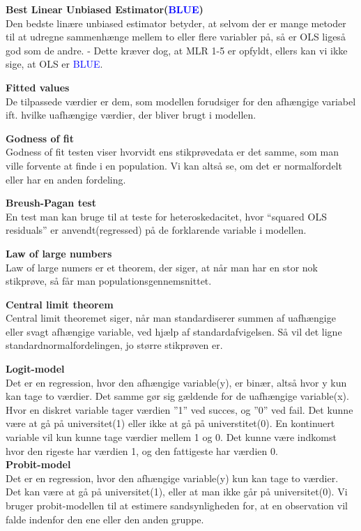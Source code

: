 \documentclass[
  10pt,
]{article}
\begin{document}
\textbf{Best Linear Unbiased Estimator(\textcolor{blue}{BLUE})}
\label{sec:BLUE}\\
Den bedste linære unbiased estimator betyder, at selvom der er mange
metoder til at udregne sammenhænge mellem to eller flere variabler på,
så er OLS ligeså god som de andre. - Dette kræver dog, at MLR 1-5 er
opfyldt, ellers kan vi ikke sige, at OLS er \textcolor{blue}{BLUE}.
\newline

\textbf{Fitted values}\\
De tilpassede værdier er dem, som modellen forudsiger for den afhængige
variabel ift. hvilke uafhængige værdier, der bliver brugt i modellen.
\newline

\textbf{Godness of fit} \label{sec:godness}\\
Godness of fit testen viser hvorvidt ens stikprøvedata er det samme, som
man ville forvente at finde i en population. Vi kan altså se, om det er
normalfordelt eller har en anden fordeling. \newline

\textbf{Breush-Pagan test} \label{sec:BP-test}\\
En test man kan bruge til at teste for heteroskedacitet, hvor ``squared
OLS residuals'' er anvendt(regressed) på de forklarende variable i
modellen. \newline

\textbf{Law of large numbers} \label{sec:lawoflarge}\\
Law of large numers er et theorem, der siger, at når man har en stor nok
stikprøve, så får man populationsgennemsnittet. \newline

\textbf{Central limit theorem} \label{sec:CLT}\\
Central limit theoremet siger, når man standardiserer summen af
uafhængige eller svagt afhængige variable, ved hjælp af
standardafvigelsen. Så vil det ligne standardnormalfordelingen, jo
større stikprøven er. \newpage

\textbf{Logit-model} \label{sec:logit}\\
Det er en regression, hvor den afhængige variable(y), er binær, altså
hvor y kun kan tage to værdier. Det samme gør sig gældende for de
uafhængige variable(x). Hvor en diskret variable tager værdien ''1'' ved
succes, og ''0'' ved fail. Det kunne være at gå på universitet(1) eller
ikke at gå på universtitet(0). En kontinuert variable vil kun kunne tage
værdier mellem 1 og 0. Det kunne være indkomst hvor den rigeste har
værdien 1, og den fattigeste har værdien 0.\\
\newline \textbf{Probit-model} \label{sec:probit}\\
Det er en regression, hvor den afhængige variable(y) kun kan tage to
værdier. Det kan være at gå på universitet(1), eller at man ikke går på
universitet(0). Vi bruger probit-modellen til at estimere
sandsynligheden for, at en observation vil falde indenfor den ene eller
den anden gruppe.
\end{document}
